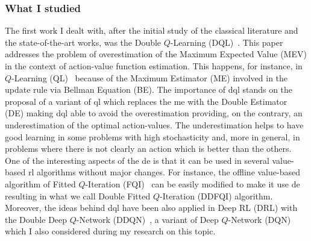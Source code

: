 \subsubsection{What I studied}
The first work I dealt with, after the initial study of the classical literature and the state-of-the-art works, was the Double $Q$-Learning (DQL)~\cite{van2010double}. This paper addresses the problem of overestimation of the Maximum Expected Value (MEV) in the context of action-value function estimation. This happens, for instance, in $Q$-Learning (QL)~\cite{smith2006optimizer} because of the Maximum Estimator (ME) involved in the update rule via Bellman Equation (BE). The importance of \gls{dql} stands on the proposal of a variant of \gls{ql} which replaces the \gls{me} with the Double Estimator (DE) making \gls{dql} able to avoid the overestimation providing, on the contrary, an underestimation of the optimal action-values. The underestimation helps to have good learning in some problems with high stochasticity and, more in general, in problems where there is not clearly an action which is better than the others. One of the interesting aspects of the \gls{de} is that it can be used in several value-based \gls{rl} algorithms without major changes. For instance, the offline value-based algorithm of Fitted $Q$-Iteration (FQI)~\cite{ernst2005tree} can be easily modified to make it use \gls{de} resulting in what we call Double Fitted $Q$-Iteration (DDFQI) algorithm. Moreover, the ideas behind \gls{dql} have been also applied in Deep RL (DRL) with the Double Deep $Q$-Network (DDQN)~\cite{hasselt2015double}, a variant of Deep $Q$-Network (DQN)~\cite{mnih2015human} which I also considered during my research on this topic.

